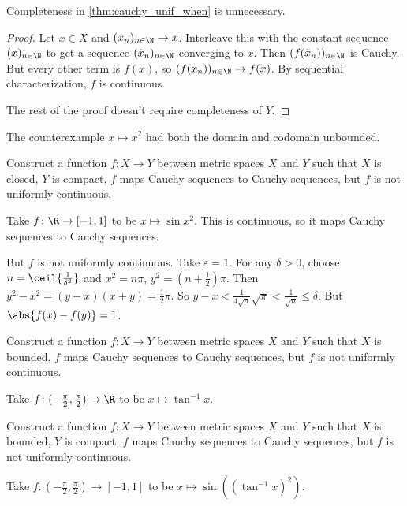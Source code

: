 \documentclass[12pt]{article}
\begin{document}
\begin{proposition*} \label{thm:cauchy_unif_when_better}
    Completeness in \cref{thm:cauchy_unif_when} is unnecessary.
\end{proposition*}
\begin{proof}
    Let $x \in X$ and $(x_n)_{n \in \N} \to x$.
    Interleave this with the constant sequence $(x)_{n \in \N}$ to get
    a sequence $(\tilde{x}_n)_{n \in \N}$ converging to $x$.
    Then $(f(\tilde{x}_n))_{n \in \N}$ is Cauchy.
    But every other term is $f(x)$, so $(f(x_n))_{n \in \N} \to f(x)$.
    By sequential characterization, $f$ is continuous.

    The rest of the proof doesn't require completeness of $Y$.
\end{proof}

\begin{exercise}
    The counterexample $x \mapsto x^2$ had both the domain and codomain
    unbounded.

    Construct a function $f\colon X \to Y$ between metric spaces $X$ and $Y$
    such that $X$ is closed, $Y$ is compact,
    $f$ maps Cauchy sequences to Cauchy sequences,
    but $f$ is not uniformly continuous.
\end{exercise}
\begin{solution}
    Take $f\colon \R \to [-1, 1]$ to be $x \mapsto \sin x^2$.
    This is continuous, so it maps Cauchy sequences to Cauchy sequences.

    But $f$ is not uniformly continuous.
    Take $\varepsilon = 1$.
    For any $\delta > 0$, choose $n = \ceil{\frac1{\delta^2}}$
    and $x^2 = n \pi$, $y^2 = (n + \frac12) \pi$.
    Then $y^2 - x^2 = (y - x)(x + y) = \frac12 \pi$.
    So $y - x < \frac1{4\sqrt n} \sqrt \pi < \frac1{\sqrt n} \le \delta$.
    But $\abs{f(x) - f(y)} = 1$.
\end{solution}

\begin{exercise}
    Construct a function $f\colon X \to Y$ between metric spaces $X$ and $Y$
    such that $X$ is bounded,
    $f$ maps Cauchy sequences to Cauchy sequences,
    but $f$ is not uniformly continuous.
\end{exercise}
\begin{solution}
    Take $f\colon (-\frac{\pi}{2}, \frac{\pi}{2}) \to \R$
    to be $x \mapsto \tan^{-1} x$.
\end{solution}

\begin{exercise*}
    Construct a function $f\colon X \to Y$ between metric spaces $X$ and $Y$
    such that $X$ is bounded, $Y$ is compact,
    $f$ maps Cauchy sequences to Cauchy sequences,
    but $f$ is not uniformly continuous.
\end{exercise*}
\begin{solution}
    Take $f\colon (-\frac{\pi}{2}, \frac{\pi}{2}) \to [-1, 1]$ to be
    $x \mapsto \sin((\tan^{-1} x)^2)$.
\end{solution}
\end{document}
